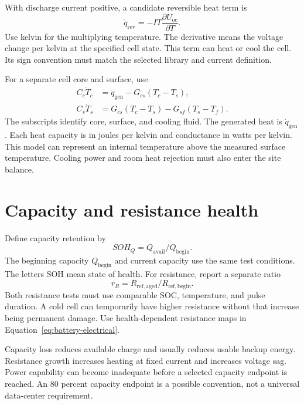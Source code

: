 \documentclass[11pt,a4paper]{report}
\begin{document}
With discharge current positive, a candidate reversible heat term is
\begin{equation}
\dot q_{\mathrm{rev}}=-IT\frac{\partial U_{\mathrm{oc}}}{\partial T}.
\end{equation}
Use kelvin for the multiplying temperature.
The derivative means the voltage change per kelvin at the specified cell state.
This term can heat or cool the cell.
Its sign convention must match the selected library and current definition.

For a separate cell core and surface, use
\begin{align}
C_c\dot T_c&=\dot q_{\mathrm{gen}}-G_{cs}(T_c-T_s),\\
C_s\dot T_s&=G_{cs}(T_c-T_s)-G_{sf}(T_s-T_f).
\end{align}
The subscripts identify core, surface, and cooling fluid.
The generated heat is $\dot q_{\mathrm{gen}}$.
Each heat capacity is in joules per kelvin and conductance in watts per kelvin.
This model can represent an internal temperature above the measured surface temperature.
Cooling power and room heat rejection must also enter the site balance.

\section{Capacity and resistance health}
Define capacity retention by
\begin{equation}
SOH_Q=Q_{\mathrm{avail}}/Q_{\mathrm{begin}}.
\end{equation}
The beginning capacity $Q_{\mathrm{begin}}$ and current capacity use the same test conditions.
The letters SOH mean state of health.
For resistance, report a separate ratio
\begin{equation}
r_R=R_{\mathrm{ref,aged}}/R_{\mathrm{ref,begin}}.
\end{equation}
Both resistance tests must use comparable SOC, temperature, and pulse duration.
A cold cell can temporarily have higher resistance without that increase being permanent damage.
Use health-dependent resistance maps in Equation~\ref{eq:battery-electrical}.

Capacity loss reduces available charge and usually reduces usable backup energy.
Resistance growth increases heating at fixed current and increases voltage sag.
Power capability can become inadequate before a selected capacity endpoint is reached.
An 80 percent capacity endpoint is a possible convention, not a universal data-center requirement.
\end{document}
